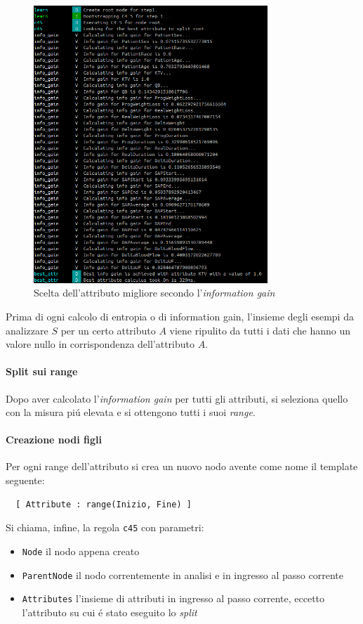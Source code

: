 \documentclass[preprint]{acm_proc_article-sp}
\begin{document}
\begin{figure}[!htb]
\centering
\includegraphics[width=250pt]{figures/prolog-best-attribute.png}
\caption{Scelta dell'attributo migliore secondo l'\textit{information gain}}
\label{fig:prolog-best-attribute}
\end{figure}

Prima di ogni calcolo di entropia o di information gain, l'insieme degli esempi da analizzare $S$ per un certo attributo $A$ viene ripulito da tutti i dati che hanno un valore nullo in corrispondenza dell'attributo $A$.

\paragraph{Split sui range}
Dopo aver calcolato l'\textit{information gain} per tutti gli attributi, si seleziona quello con la misura pi\'u elevata e si ottengono tutti i suoi \textit{range}.

\paragraph{Creazione nodi figli}
Per ogni range dell'attributo si crea un nuovo nodo avente come nome il template seguente:
\begin{verbatim}
  [ Attribute : range(Inizio, Fine) ]
\end{verbatim}
Si chiama, infine, la regola \verb|c45| con parametri:
\begin{itemize}
\item \verb|Node| il nodo appena creato
\item \verb|ParentNode| il nodo correntemente in analisi e in ingresso al passo corrente
\item \verb|Attributes| l'insieme di attributi in ingresso al passo corrente, eccetto l'attributo su cui \'e stato eseguito lo \textit{split}
\end{itemize}
\end{document}
